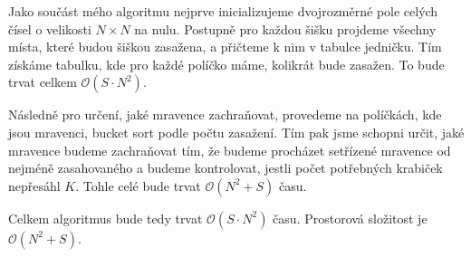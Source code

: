 \documentclass{fkssolpub}
\author{Ondřej Sedláček}
\begin{document}
 

Jako součást mého algoritmu nejprve inicializujeme dvojrozměrné
pole celých čísel o velikosti $N \times N$ na nulu. Postupně pro
každou šišku projdeme všechny místa, které budou šiškou zasažena,
a přičteme k nim v tabulce jedničku. Tím získáme tabulku, kde pro
každé políčko máme, kolikrát bude zasažen. To bude trvat celkem
$\mathcal{O}(S \cdot N^2)$.

Následně pro určení, jaké mravence zachraňovat, provedeme na políčkách,
kde jsou mravenci, bucket sort podle počtu zasažení. Tím pak jsme
schopni určit, jaké mravence budeme zachraňovat tím, že budeme procházet
setřízené mravence od nejméně zasahovaného a budeme kontrolovat, jestli
počet potřebných krabiček nepřesáhl $K$. Tohle celé bude trvat
$\mathcal{O}(N^2 + S)$ času.

Celkem algoritmus bude tedy trvat $\mathcal{O}(S \cdot N^2)$ času.
Prostorová složitost je $\mathcal{O}(N^2 + S)$.
\end{document}
